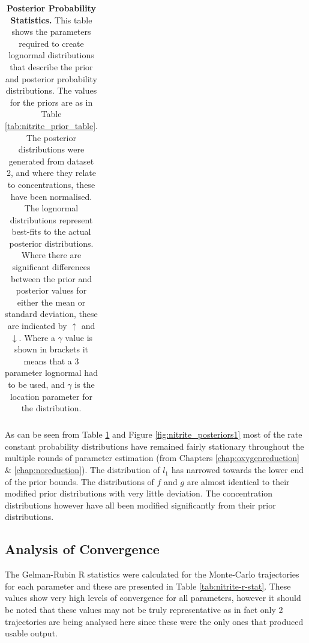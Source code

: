 \begin{table}[tbp]
\begin{center}
\begin{tabular}{ccccc}
\bottomrule
\end{tabular}
\end{center}
\caption[Posterior Probability Statistics]{{\bf Posterior Probability Statistics.} This table shows the parameters required to create lognormal distributions that describe the prior and posterior probability distributions. The values for the priors are as in Table \ref{tab:nitrite_prior_table}. The posterior distributions were generated from dataset 2, and where they relate to concentrations, these have been normalised. The lognormal distributions represent best-fits to the actual posterior distributions. Where there are significant differences between the prior and posterior values for either the mean or standard deviation, these are indicated by $\uparrow$ and $\downarrow$. Where a $\gamma$ value is shown in brackets it means that a 3 parameter lognormal had to be used, and $\gamma$ is the location parameter for the distribution.
\label{tab:nitrite-posteriors-table}}
\end{table}

As can be seen from Table \ref{tab:nitrite-posteriors-table} and Figure \ref{fig:nitrite_posteriors1} most of the rate constant probability distributions have remained fairly stationary throughout the multiple rounds of parameter estimation (from Chapters \ref{chap:oxygenreduction} \& \ref{chap:noreduction}). The distribution of $l_1$ has narrowed towards the lower end of the prior bounds. The distributions of $f$ and $g$ are almost identical to their modified prior distributions with very little deviation. The concentration distributions however have all been modified significantly from their prior distributions.

\subsection{Analysis of Convergence}
The Gelman-Rubin R statistics were calculated for the Monte-Carlo trajectories for each parameter and these are presented in Table \ref{tab:nitrite-r-stat}. These values show very high levels of convergence for all parameters, however it should be noted that these values may not be truly representative as in fact only 2 trajectories are being analysed here since these were the only ones that produced usable output.

